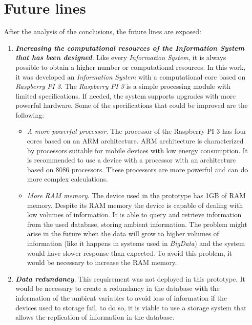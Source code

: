 \section{Future lines}

After the analysis of the conclusions, the future lines are exposed: 

\begin{enumerate}

\item \textbf{\textit{Increasing the computational resources of the \textit{Information System} that has been designed}}. Like every \textit{Information System}, it is always possible to obtain a higher number or computational resources. In this work, it was developed an \textit{Information System} with a computational core based on \textit{Raspberry PI 3}. The \textit{Raspberry PI 3} is a simple processing module with limited specifications. If needed, the system supports upgrades with more powerful hardware. Some of the specifications that could be improved are the following:\\

\begin{itemize}

\item \textit{A more powerful processor}. The processor of the Raspberry PI 3 has four cores based on an ARM architecture. ARM architecture is characterized by processors suitable for mobile devices with low energy consumption. It is recommended to use a device with a processor with an architecture based on 8086 processors. These processors are more powerful and can do more complex calculations.

\item \textit{More RAM memory}. The device used in the prototype has 1GB of RAM memory. Despite its RAM memory the device is capable of dealing with low volumes of information. It is able to query and retrieve information from the used database, storing ambient information. The problem might arise in the future when the data will grow to higher volumes of information (like it happens in systems used in \textit{BigData}) and the system would have slower response than expected. To avoid this problem, it would be necessary to increase the RAM memory.

\end{itemize}

\item \textbf{\textit{Data redundancy}}. This requirement was not deployed in this prototype. It would be necessary to create a redundancy in the database with the information of the ambient variables to avoid loss of information if the devices used to storage fail. to do so, it is viable to use a storage system that allows the replication of information in the database.


\end{enumerate}

